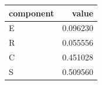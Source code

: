 \begin{tabular}{lr}
\toprule
component & value \\
\midrule
E & 0.096230 \\
R & 0.055556 \\
C & 0.451028 \\
S & 0.509560 \\
\bottomrule
\end{tabular}
